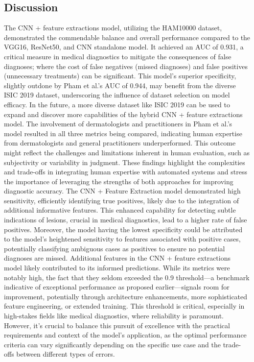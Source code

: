 \documentclass[10pt,twocolumn]{article}
\begin{document}
\subsection{Discussion}
The CNN + feature extractions model, utilizing the HAM10000 dataset, demonstrated the commendable balance and overall performance compared to the VGG16, ResNet50, and CNN standalone model. It achieved an AUC of 0.931, a critical measure in medical diagnostics to mitigate the consequences of false diagnoses; where the cost of false negatives (missed diagnoses) and false positives (unnecessary treatments) can be significant. This model's superior specificity, slightly outdone by Pham et al.'s AUC of 0.944, may benefit from the diverse ISIC 2019 dataset, underscoring the influence of dataset selection on model efficacy. In the future, a more diverse dataset like ISIC 2019 can be used to expand and discover more capabilities of the hybrid CNN + feature extractions model. The involvement of dermatologists and practitioners in Pham et al.'s model resulted in all three metrics being compared, indicating human expertise from dermatologists and general practitioners underperformed. This outcome might reflect the challenges and limitations inherent in human evaluation, such as subjectivity or variability in judgment. These findings highlight the complexities and trade-offs in integrating human expertise with automated systems and stress the importance of leveraging the strengths of both approaches for improving diagnostic accuracy. \newline
The CNN + Feature Extraction model demonstrated high sensitivity, efficiently identifying true positives, likely due to the integration of additional informative features. This enhanced capability for detecting subtle indications of lesions, crucial in medical diagnostics, lead to a higher rate of false positives. Moreover, the model having the lowest specificity could be attributed to the model's heightened sensitivity to features associated with positive cases, potentially classifying ambiguous cases as positives to ensure no potential diagnoses are missed. \newline
Additional features in the CNN + feature extractions model likely contributed to its informed predictions. While its metrics were notably high, the fact that they seldom exceeded the 0.9 threshold—a benchmark indicative of exceptional performance as proposed earlier—signals room for improvement, potentially through architecture enhancements, more sophisticated feature engineering, or extended training. This threshold is critical, especially in high-stakes fields like medical diagnostics, where reliability is paramount. However, it's crucial to balance this pursuit of excellence with the practical requirements and context of the model's application, as the optimal performance criteria can vary significantly depending on the specific use case and the trade-offs between different types of errors. \newline
\end{document}
